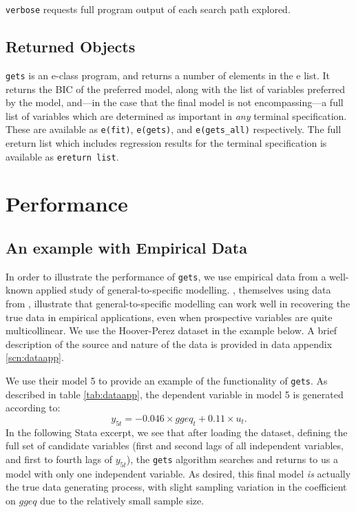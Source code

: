 \documentclass[bib]{statapress}
\begin{document}
\hangpara
\texttt{verbose} requests full program output of each search path explored.

\subsection{Returned Objects}
\texttt{gets} is an e-class program, and returns a number of elements in the 
e list.  It returns the BIC of the preferred model, along with the list of 
variables preferred by the model, and---in the case that the final model is not
encompassing---a full list of variables which are determined as important in
\emph{any} terminal specification.  These are available as \texttt{e(fit)}, 
\texttt{e(gets)}, and \texttt{e(gets\_all)} respectively.  The full ereturn
list which includes regression results for the terminal specification is 
available as \texttt{ereturn list}.

\section{Performance}
\subsection{An example with Empirical Data}
In order to illustrate the performance of \texttt{gets}, we use empirical data 
from a well-known applied study of general-to-specific modelling.  
\citet{HooverPerez1999}, themselves using data from \citet{Lovell1983}, 
illustrate that general-to-specific modelling can work well in recovering the 
true data in empirical applications, even when prospective variables are quite 
multicollinear.  We use the Hoover-Perez dataset in the example below.  A brief 
description of the source and nature of the data is provided in data appendix 
\ref{scn:dataapp}.

We use their model 5 to provide an example of the functionality of 
\texttt{gets}.  As described in table \ref{tab:dataapp}, the dependent variable
in model 5 is generated according to:
\begin{equation}
 y_{5t}=-0.046\times ggeq_t + 0.11\times u_t.
\end{equation}
In the following Stata excerpt, we see that after loading the dataset, defining
the full set of candidate variables (first and second lags of all independent 
variables, and first to fourth lags of $y_{5t}$), the \texttt{gets} algorithm 
searches and returns to us a model with only one independent variable.  As 
desired, this final model \emph{is} actually the true data generating process,
with slight sampling variation in the coefficient on $ggeq$ due to the 
relatively small sample size.
\end{document}
